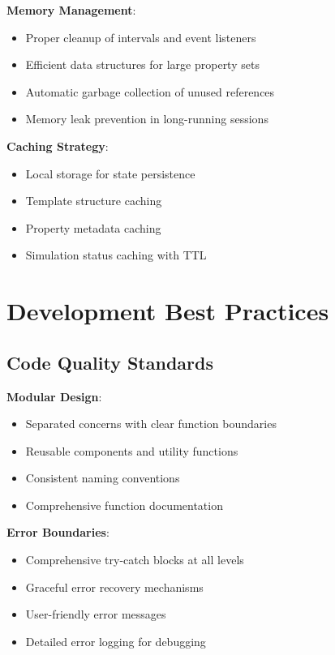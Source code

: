 \documentclass[12pt,a4paper]{article}
\begin{document}
\textbf{Memory Management}:
\begin{itemize}
    \item Proper cleanup of intervals and event listeners
    \item Efficient data structures for large property sets
    \item Automatic garbage collection of unused references
    \item Memory leak prevention in long-running sessions
\end{itemize}

\textbf{Caching Strategy}:
\begin{itemize}
    \item Local storage for state persistence
    \item Template structure caching
    \item Property metadata caching
    \item Simulation status caching with TTL
\end{itemize}

\section{Development Best Practices}

\subsection{Code Quality Standards}

\textbf{Modular Design}:
\begin{itemize}
    \item Separated concerns with clear function boundaries
    \item Reusable components and utility functions
    \item Consistent naming conventions
    \item Comprehensive function documentation
\end{itemize}

\textbf{Error Boundaries}:
\begin{itemize}
    \item Comprehensive try-catch blocks at all levels
    \item Graceful error recovery mechanisms
    \item User-friendly error messages
    \item Detailed error logging for debugging
\end{itemize}
\end{document}
